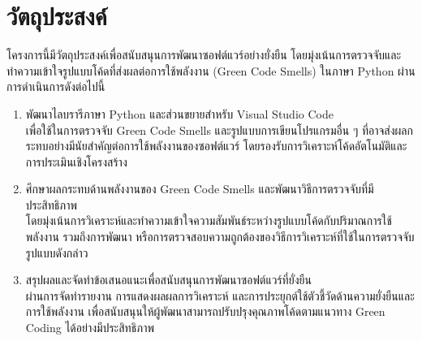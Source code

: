 \section{วัตถุประสงค์}
\label{Sec:Objective}
โครงการนี้มีวัตถุประสงค์เพื่อสนับสนุนการพัฒนาซอฟต์แวร์อย่างยั่งยืน โดยมุ่งเน้นการตรวจจับและทำความเข้าใจรูปแบบโค้ดที่ส่งผลต่อการใช้พลังงาน (Green Code Smells) ในภาษา Python ผ่านการดำเนินการดังต่อไปนี้
\begin{enumerate}
    \item {\boldfont พัฒนาไลบรารีภาษา Python และส่วนขยายสำหรับ Visual Studio Code} \\
    เพื่อใช้ในการตรวจจับ Green Code Smells และรูปแบบการเขียนโปรแกรมอื่น ๆ ที่อาจส่งผลกระทบอย่างมีนัยสำคัญต่อการใช้พลังงานของซอฟต์แวร์ โดยรองรับการวิเคราะห์โค้ดอัตโนมัติและการประเมินเชิงโครงสร้าง
    \item {\boldfont ศึกษาผลกระทบด้านพลังงานของ Green Code Smells และพัฒนาวิธีการตรวจจับที่มีประสิทธิภาพ} \\
    โดยมุ่งเน้นการวิเคราะห์และทำความเข้าใจความสัมพันธ์ระหว่างรูปแบบโค้ดกับปริมาณการใช้พลังงาน รวมถึงการพัฒนา หรือการตรวจสอบความถูกต้องของวิธีการวิเคราะห์ที่ใช้ในการตรวจจับรูปแบบดังกล่าว
    \item {\boldfont สรุปผลและจัดทำข้อเสนอแนะเพื่อสนับสนุนการพัฒนาซอฟต์แวร์ที่ยั่งยืน} \\
    ผ่านการจัดทำรายงาน การแสดงผลผลการวิเคราะห์ และการประยุกต์ใช้ตัวชี้วัดด้านความยั่งยืนและการใช้พลังงาน เพื่อสนับสนุนให้ผู้พัฒนาสามารถปรับปรุงคุณภาพโค้ดตามแนวทาง Green Coding ได้อย่างมีประสิทธิภาพ
\end{enumerate}


